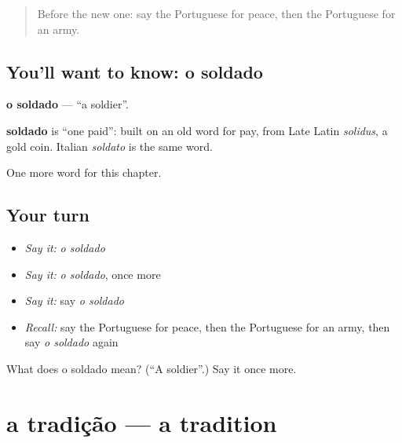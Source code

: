 \label{lesson:PT-C219-soldado}



\begin{quote}
Before the new one: say the Portuguese for peace, then the Portuguese for an army.
\end{quote}

\subsection*{You'll want to know: o soldado}
\textbf{o soldado} — \textquotedblleft{}a soldier\textquotedblright{}.

\begin{cousinweb}
\textbf{soldado} is \textquotedblleft{}one paid\textquotedblright{}: built on an old word for pay, from Late Latin \emph{solidus}, a gold coin. Italian \emph{soldato} is the same word.
\end{cousinweb}

\begin{grammarlens}[title={What you've built}]
One more word for this chapter.
\end{grammarlens}

\subsection*{Your turn}
\begin{itemize}
\raggedright
  \item \emph{Say it:} \emph{o soldado}
  \item \emph{Say it:} \emph{o soldado}, once more
  \item \emph{Say it:} say \emph{o soldado}
  \item \emph{Recall:} say the Portuguese for peace, then the Portuguese for an army, then say \emph{o soldado} again
\end{itemize}

\begin{tcolorbox}[breakable,colback=teal!4,colframe=teal!35!black,title={Before you move on}]
What does o soldado mean? (\textquotedblleft{}A soldier\textquotedblright{}.) Say it once more.
\end{tcolorbox}
\section[a tradição]{a tradição — a tradition}

\label{lesson:PT-C219-tradicao}



